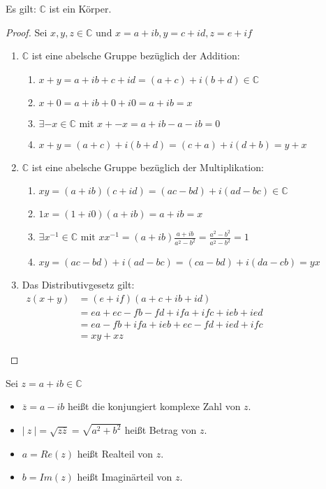 \documentclass[a4paper,titlepage,oneside]{article}
\def\C{\ensuremath{\mathbb{C}} }
\def\im{\ensuremath{\mathit{i}} }
\newcommand{\abs}[1]{\ensuremath{\left|\:#1\:\right|}}
\theoremstyle{thmstyle}
\begin{document}
\newpage
\begin{satz}
Es gilt:  \C ist ein Körper.
\begin{proof} Sei \( x,y,z \in \C \text{ und } x = a + \im b, y = c + \im d, z = e + \im f \)
\begin{enumerate}[label=\Roman*)]
\item \C ist eine abelsche Gruppe bezüglich der Addition:
\begin{enumerate}[label=\roman*)]
\item \( x + y = a + \im b + c + \im d = (a+c) + \im (b + d) \in \C\)
\item \(x + 0 = a + \im b + 0 + \im 0 = a + \im b = x \)
\item \( \exists -x \in \C \text{ mit } x + -x = a + \im b - a -\im b = 0 \)
\item \( x+y =  (a+c) + \im (b + d) =  (c + a) + \im (d + b) = y + x \)
\end{enumerate}
\item \C ist eine abelsche Gruppe bezüglich der Multiplikation:
\begin{enumerate}[label=\roman*)]
\item \( xy = (a + \im b)(c + \im d) = (ac - bd) + \im (ad - bc) \in \C\)
\item \( 1x = (1+\im 0)(a + \im b ) = a + \im b = x \)
\item \( \exists x^{-1} \in \C \text{ mit } xx^{-1} = (a + \im b)\frac{a + \im b}{a^2 - b^2} = \frac{a^2 - b^2}{a^2 - b^2} = 1\)
\item \( xy = (ac - bd) + \im (ad - bc) = (ca - bd) + \im (da - cb) = yx\)
\end{enumerate}
\item Das Distributivgesetz gilt:\\
 \begin{math}\begin{aligned} z (x + y) &= (e + \im f)( a+c + \im b + \im d) \\
 &= ea + ec - fb - fd + \im fa +\im fc + \im eb + \im ed \\
 &= ea - fb + \im fa + \im eb + ec - fd + \im ed + \im fc \\
 &= xy + xz\end{aligned}\end{math}
\end{enumerate}
\end{proof}
\end{satz}

\begin{defi}
Sei \( z = a + \im b \in \C \)
\begin{itemize}
\item \(\overline{z} = a - \im b \) heißt die konjungiert komplexe Zahl von $z$.
\item \(\abs{z} = \sqrt{z \overline{z}} = \sqrt{a^2 + b^2}\) heißt Betrag von \(z\).
\item $a = Re(z)$ heißt Realteil von $z$.
\item $b = Im(z)$ heißt Imaginärteil von $z$.
\end{itemize}
\end{defi}
\end{document}
